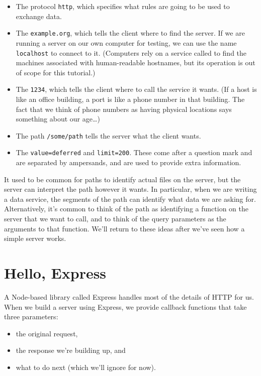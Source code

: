 \begin{itemize}
\item
  The protocol \texttt{http}, which specifies what rules are going to be used to exchange data.
\item
  The  \texttt{example.org}, which tells the client where to find the server.
  If we are running a server on our own computer for testing,
  we can use the name \texttt{localhost} to connect to it.
  (Computers rely on a service called 
  to find the machines associated with human-readable hostnames,
  but its operation is out of scope for this tutorial.)
\item
  The  \texttt{1234}, which tells the client where to call the service it wants.
  (If a host is like an office building, a port is like a phone number in that building.
  The fact that we think of phone numbers as having physical locations
  says something about our age{\ldots})
\item
  The path \texttt{/some/path} tells the server what the client wants.
\item
  The  \texttt{value=deferred} and \texttt{limit=200}.
  These come after a question mark and are separated by ampersands,
  and are used to provide extra information.
\end{itemize}

It used to be common for paths to identify actual files on the server,
but the server can interpret the path however it wants.
In particular,
when we are writing a data service,
the segments of the path can identify what data we are asking for.
Alternatively,
it's common to think of the path as identifying a function on the server that we want to call,
and to think of the query parameters as the arguments to that function.
We'll return to these ideas after we've seen how a simple server works.

\section{Hello, Express}\label{s:server-express}

A Node-based library called Express handles most of the details of HTTP for us.
When we build a server using Express,
we provide callback functions that take three parameters:

\begin{itemize}
\item
  the original request,
\item
  the response we're building up, and
\item
  what to do next (which we'll ignore for now).
\end{itemize}


